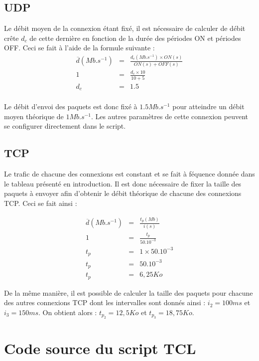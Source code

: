 \documentclass[a4paper]{article}
\begin{document}
\subsection{UDP}

Le débit moyen de la connexion étant fixé, il est nécessaire de calculer de débit crête $d_c$ de
cette dernière en fonction de la durée des périodes ON et périodes OFF. Ceci se fait à l'aide de la
formule suivante : 
$$
\begin{array}{rcl}
\overline{d} (Mb.s^{-1}) & = & \frac{d_{c} (Mb.s^{-1}) \times ON (s)}{ON(s) + OFF(s)} \\
1 & = & \frac{d_{c} \times 10}{10 + 5} \\
d_{c} &= &1.5 \\
\end{array}
$$

Le débit d'envoi des paquets est donc fixé à $1.5Mb.s^{-1}$ pour atteindre un débit moyen théorique de $1Mb.s^{-1}$.
Les autres paramètres de cette connexion peuvent se configurer directement dans le script.

\subsection{TCP}

Le trafic de chacune des connexions est constant et se fait à féquence donnée dans le tableau
présenté en introduction. Il est donc nécessaire de fixer la taille des paquets à envoyer afin
d'obtenir le débit théorique de chacune des connexions TCP. Ceci se fait ainsi :

$$
\begin{array}{rcl}
\overline{d}(Mb.s^{-1}) &=& \frac{t_p (Mb)}{i (s)} \\
1 &=& \frac{t_p}{50.10^{-3}} \\
t_p & = & 1\times 50.10^{-3} \\
t_p & = & 50.10^{-3} \\
t_p & = & 6,25 Ko 
\end{array}$$

De la même manière, il est possible de calculer la taille des paquets pour chacune des autres
connexions TCP dont les intervalles sont donnés ainsi : $i_2 = 100ms$ et $i_3 = 150 ms$. On obtient
alors : $t_{p_2} = 12,5 Ko$ et $t_{p_3} = 18,75 Ko$.


\section{Code source du script TCL}
\end{document}
